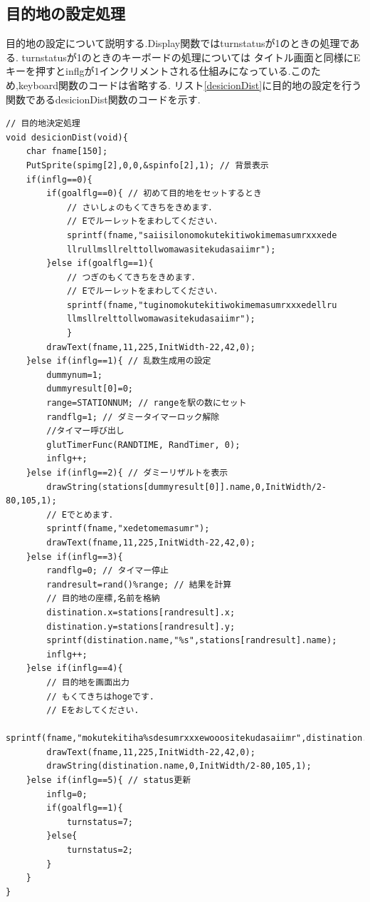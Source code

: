 \documentclass[a4j]{jarticle}
\begin{document}
    \subsection{目的地の設定処理}
    目的地の設定について説明する.Display関数ではturnstatusが1のときの処理である. turnstatusが1のときのキーボードの処理については
    タイトル画面と同様にEキーを押すとinflgが1インクリメントされる仕組みになっている.このため,keyboard関数のコードは省略する.
    リスト\ref{desicionDist}に目的地の設定を行う関数であるdesicionDist関数のコードを示す.
        \begin{lstlisting}[basicstyle=\ttfamily\footnotesize, frame=single,label=desicionDist,caption=desicionDist関数]
// 目的地決定処理
void desicionDist(void){
    char fname[150];
    PutSprite(spimg[2],0,0,&spinfo[2],1); // 背景表示
    if(inflg==0){
        if(goalflg==0){ // 初めて目的地をセットするとき
            // さいしょのもくてきちをきめます．
            // Eでルーレットをまわしてください．
            sprintf(fname,"saiisilonomokutekitiwokimemasumrxxxede
            llrullmsllrelttollwomawasitekudasaiimr");             
        }else if(goalflg==1){
            // つぎのもくてきちをきめます．
            // Eでルーレットをまわしてください．                
            sprintf(fname,"tuginomokutekitiwokimemasumrxxxedellru
            llmsllrelttollwomawasitekudasaiimr");                 
            }
        drawText(fname,11,225,InitWidth-22,42,0);
    }else if(inflg==1){ // 乱数生成用の設定
        dummynum=1;
        dummyresult[0]=0;
        range=STATIONNUM; // rangeを駅の数にセット
        randflg=1; // ダミータイマーロック解除
        //タイマー呼び出し
        glutTimerFunc(RANDTIME, RandTimer, 0);
        inflg++;
    }else if(inflg==2){ // ダミーリザルトを表示
        drawString(stations[dummyresult[0]].name,0,InitWidth/2-80,105,1); 
        // Eでとめます．
        sprintf(fname,"xedetomemasumr");
        drawText(fname,11,225,InitWidth-22,42,0);             
    }else if(inflg==3){
        randflg=0; // タイマー停止
        randresult=rand()%range; // 結果を計算
        // 目的地の座標,名前を格納
        distination.x=stations[randresult].x;
        distination.y=stations[randresult].y;
        sprintf(distination.name,"%s",stations[randresult].name);
        inflg++;
    }else if(inflg==4){
        // 目的地を画面出力
        // もくてきちはhogeです.
        // Eをおしてください.
        sprintf(fname,"mokutekitiha%sdesumrxxxewooositekudasaiimr",distination.name);
        drawText(fname,11,225,InitWidth-22,42,0); 
        drawString(distination.name,0,InitWidth/2-80,105,1);  
    }else if(inflg==5){ // status更新
        inflg=0;
        if(goalflg==1){
            turnstatus=7;
        }else{
            turnstatus=2;
        }
    }
}
        \end{lstlisting} 
    
\end{document}
